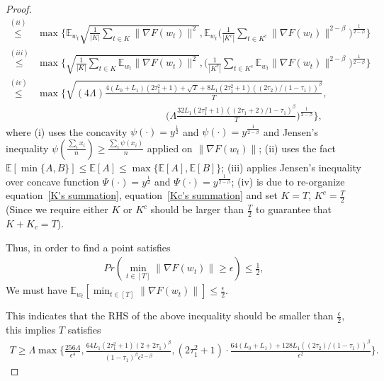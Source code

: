 \documentclass[10pt]{article} %
\def\eqref#1{equation~\ref{#1}}
\newtheorem{proof}{Proof}
\begin{document}
\begin{proof}
\begin{align}
    \overset{(ii)}{\leq}&\max\Big\{\mathbb{E}_{w_t}\sqrt{\frac{1}{|K|} \sum_{t\in K}^{} \big \|\nabla F(w_t) \big \|^2 }, \mathbb{E}_{w_t}\Big(\frac{1}{|K^c|}\sum_{t\in K^c}^{}\big \| \nabla F(w_t) \big \|^{2-\beta} \Big)^{\frac{1}{2-\beta}} \Big\} \nonumber\\
    \overset{(iii)}{\leq}&\max\Big\{\sqrt{\frac{1}{|K|} \sum_{t\in K}^{} \mathbb{E}_{w_t}\big \|\nabla F(w_t) \big \|^2 }, \Big(\frac{1}{|K^c|}\sum_{t\in K^c}^{} \mathbb{E}_{w_t}\big \| \nabla F(w_t) \big \|^{2-\beta} \Big)^{\frac{1}{2-\beta}} \Big\} \nonumber\\
    \overset{(iv)}{\leq}& \max \Big \{\sqrt{(4\Lambda) \frac{4(L_0+L_1)(2\tau_1^2+1)+\sqrt{T}+8L_1(2\tau_1^2+1)((2\tau_2)/(1-\tau_1))^{\beta}}{T}},\nonumber\\
    &\qquad \qquad \qquad \qquad \qquad \qquad \quad \big(\Lambda \frac{32L_1(2\tau_1^2+1)((2\tau_1+2)/1-\tau_1)^{\beta}}{T}\big)^{\frac{1}{2-\beta}} \Big \}, \nonumber
\end{align}
where (i) uses the concavity $\psi(\cdot)=y^{\frac{1}{2}}$ and $\psi(\cdot)=y^{\frac{1}{2-\beta}}$ and Jensen's inequality $\psi(\frac{\sum_i x_i}{n})\geq \frac{\sum_{i}\psi(x_i)}{n}$
applied on $\| \nabla F(w_t)\|$; (ii) uses the fact $\mathbb{E}[\min\{A,B\}]\leq \mathbb{E}[A]\leq \max\{\mathbb{E}[A], \mathbb{E}[B]\}$; (iii) applies Jensen's inequality over concave function $\Psi(\cdot)=y^{\frac{1}{2}}$ and $\Psi(\cdot)=y^{\frac{1}{2-\beta}}$;
(iv) is due to re-organize \eqref{K's summation}, \eqref{Kc's summation} and set $K={T}$, $K^c=\frac{T}{2}$ (Since we require either $K$ or $K^c$ should be larger than $\frac{T}{2}$ to guarantee that $K+K_c=T$).

Thus, in order to find a point satisfies
\begin{align}
    Pr(\min_{t\in[T]}\| \nabla F(w_t) \| \geq \epsilon)\leq \frac{1}{2}, \nonumber 
\end{align}
We must have $\mathbb{E}_{w_t}[\min_{t\in [T]} \| \nabla F(w_t) \| ]\leq \frac{\epsilon}{2}$.

This indicates that the RHS of the above inequality should be smaller than $\frac{\epsilon}{2}$, this implies $T$ satisfies
\begin{align}
    T \geq \Lambda \max \Big\{\frac{256\Lambda}{\epsilon^4}, \frac{64L_1(2\tau_1^2+1)(2+2\tau_1)^{\beta}}{(1-\tau_1)^{\beta}\epsilon^{2-\beta}}, (2\tau_1^2+1)\cdot\frac{64(L_0+L_1)+128L_1((2\tau_2)/(1-\tau_1))^{\beta}}{\epsilon^2} \Big\}.
\end{align}
\end{proof}
\end{document}
